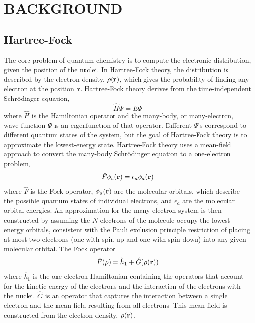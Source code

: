 \documentclass[twoside,11pt]{article}
\begin{document}
\section{BACKGROUND}

\subsection{Hartree-Fock}
The core problem of quantum chemistry is to compute the electronic distribution, given the position of the nuclei. In Hartree-Fock theory, the distribution is described by the electron density, $\rho({\bf r})$, which gives the probability of finding any electron at the position ${\bf r}$. Hartree-Fock theory derives from the time-independent Schr\"{o}dinger equation,
\begin{equation} \label{eq:schrodinger}
				\hat{H}\Psi = E\Psi
\end{equation}
where $\hat{H}$ is the Hamiltonian operator and the many-body, or many-electron, wave-function $\Psi$ is an eigenfunction of that operator. Different $\Psi$'s correspond to different quantum states of the system, but the goal of Hartree-Fock theory is to approximate the lowest-energy state. Hartree-Fock theory uses a mean-field approach to convert the many-body Schr\"{o}dinger equation to a one-electron problem,
\begin{equation} \label{eq:fockSchrodinger}
				\hat{F}\phi_a({\bf r}) = \epsilon_a \phi_a({\bf r})
\end{equation}
where $\hat{F}$ is the Fock operator, $\phi_a({\bf r})$ are the molecular orbitals, which describe the possible quantum states of individual electrons, and $\epsilon_a$ are the molecular orbital energies. An approximation for the many-electron system is then constructed by assuming the $N$ electrons of the molecule occupy the lowest-energy orbitals, consistent with the Pauli exclusion principle restriction of placing at most two electrons (one with spin up and one with spin down) into any given molecular orbital. The Fock operator
\begin{equation} \label{eq:fock}
\hat{F}(\rho) = \hat{h}_1 + \hat{G}(\rho({\bf r}))
\end{equation}
where $\hat{h}_1$ is the one-electron Hamiltonian containing the operators that account for the kinetic energy of the electrons and the interaction of the electrons with the nuclei. $\hat{G}$ is an operator that captures the interaction between a single electron and the mean field resulting from all electrons. This mean field is constructed from the electron density, $\rho({\bf r})$. 
\end{document}
